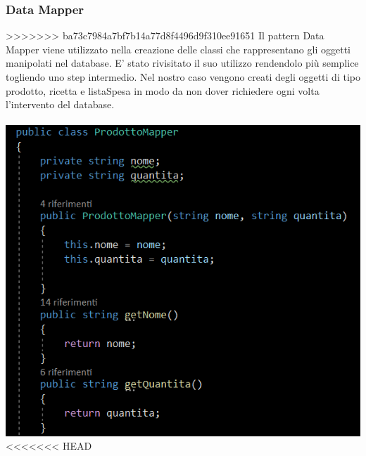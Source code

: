 \documentclass[a4paper, titlepage]{article}
\begin{document}
\subsubsection{Data Mapper}
>>>>>>> ba73c7984a7bf7b14a77d8f4496d9f310ee91651
Il pattern Data Mapper viene utilizzato nella creazione delle classi che rappresentano gli oggetti manipolati nel database.
E' stato rivisitato il suo utilizzo rendendolo più semplice togliendo uno step intermedio.
Nel nostro caso vengono creati degli oggetti di tipo prodotto, ricetta e listaSpesa in modo da non dover richiedere ogni volta l'intervento del database.\\\\
\includegraphics[scale=0.70]{Immagini/DataMapper.PNG}
\newpage
<<<<<<< HEAD
\end{document}

